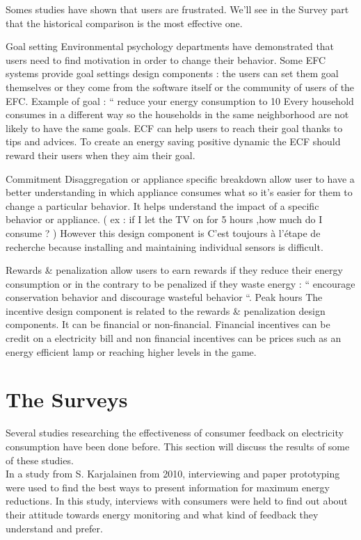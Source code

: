 \documentclass[journal]{vgtc}                %
\begin{document}
Somes studies have shown that users are frustrated.
We'll see in the Survey part that the historical comparison is the most effective one.



Goal setting 
Environmental psychology departments have demonstrated that users need to find motivation in order to change their behavior. Some EFC systems provide goal settings design components : the users can set them goal themselves or they come from the software itself or the community of users of the EFC. Example of goal : “ reduce your energy consumption to 10%
Every household consumes in a different way so the households in the same neighborhood are not likely to have the same goals.
ECF can help users to reach their goal thanks to tips and advices.
To create an energy saving positive dynamic the ECF should reward their users when they aim their goal. 

Commitment
Disaggregation or appliance specific breakdown allow user to have a better understanding in which appliance consumes what so it's easier for them to change a particular behavior. It helps understand the impact of a specific behavior or appliance. ( ex : if I let the TV on for 5 hours ,how much do I consume ? )
However this design component is C'est toujours à l'étape de recherche because installing and maintaining individual sensors is difficult.

Rewards & penalization allow users to earn rewards if they reduce their energy consumption or in the contrary to be penalized if they waste energy : “ encourage conservation behavior and discourage wasteful behavior “.
Peak hours
The incentive design component is related to the rewards & penalization design components. It can be financial or non-financial. Financial incentives can be credit on a electricity bill and non financial incentives can be prices such as an energy efficient lamp or reaching higher levels in the game.

\section{The Surveys}
Several studies researching the effectiveness of consumer feedback on electricity consumption have been done before.
This section will discuss the results of some of these studies. \\

In a study from S. Karjalainen\cite{karjalainen2011consumer} from 2010, interviewing and paper prototyping were used to find the best ways to present information for maximum energy reductions. In this study, interviews with consumers were held to find out about their attitude towards energy monitoring and what kind of feedback they understand and prefer.
\end{document}
